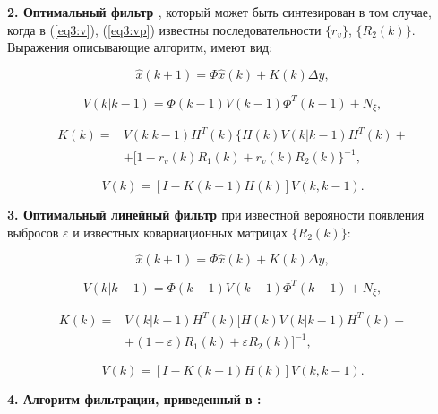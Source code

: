 \textbf{2. Оптимальный фильтр \cite{Klekis}}, который может быть синтезирован в том случае, когда в (\ref{eq3:v}), (\ref{eq3:vp}) известны последовательности $\{r_v\}$, $\{R_2(k)\}$. Выражения описывающие алгоритм, имеют вид:

\begin{equation}\label{eq3:optim2}
\hat{x}(k+1)=\Phi\hat{x}(k)+K(k)\Delta y,
\end{equation}

\begin{equation}\label{eq3:optim2_3}
V(k|k-1)=\Phi(k-1)V(k-1)\Phi^T(k-1)+N_\xi,
\end{equation}

\begin{equation}\label{eq3:optim2_4}
\begin{split}
K(k)=&V(k|k-1)H^T(k)\{H(k)V(k|k-1)H^T(k)+\\
&+[1-r_v(k)R_1(k)+r_v(k)R_2(k)\}^{-1},
\end{split}
\end{equation}

\begin{equation}\label{eq3:optim2_5}
V(k)=[I-K(k-1)H(k)]V(k,k-1).
\end{equation}

\textbf{3. Оптимальный линейный фильтр \cite{Klekis}} при известной верояности появления выбросов $\varepsilon$ и известных ковариационных матрицах $\{R_2(k)\}$:

\begin{equation}\label{eq3:optim3}
\hat{x}(k+1)=\Phi\hat{x}(k)+K(k)\Delta y,
\end{equation}

\begin{equation}\label{eq3:optim3_3}
V(k|k-1)=\Phi(k-1)V(k-1)\Phi^T(k-1)+N_\xi,
\end{equation}

\begin{equation}\label{eq3:optim3_4}
\begin{split}
K(k)=&V(k|k-1)H^T(k)[H(k)V(k|k-1)H^T(k)+\\
&+(1-\varepsilon)R_1(k)+\varepsilon R_2(k)]^{-1},
\end{split}
\end{equation}

\begin{equation}\label{eq3:optim3_5}
V(k)=[I-K(k-1)H(k)]V(k,k-1).
\end{equation}

\textbf{4. Алгоритм фильтрации, приведенный в \cite{ershov}:}

